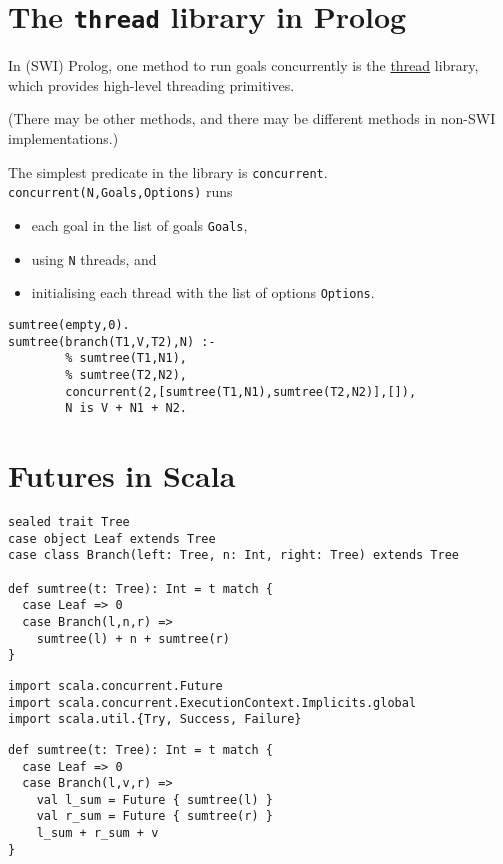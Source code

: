 \documentclass[11pt]{article}
\begin{document}
\section{The \texttt{thread} library in Prolog}
\label{sec:org5ab70c6}
In (SWI) Prolog, one method to run goals concurrently is
the \href{https://www.swi-prolog.org/pldoc/man?section=thread}{thread} library,
which provides high-level threading primitives.

(There may be other methods, and there may be different methods
 in non-SWI implementations.)

The simplest predicate in the library is \texttt{concurrent}.
\texttt{concurrent(N,Goals,Options)} runs
\begin{itemize}
\item each goal in the list of goals \texttt{Goals},
\item using \texttt{N} threads, and
\item initialising each thread with the list of options \texttt{Options}.
\end{itemize}
\begin{verbatim}
sumtree(empty,0).
sumtree(branch(T1,V,T2),N) :-
        % sumtree(T1,N1),
        % sumtree(T2,N2),
        concurrent(2,[sumtree(T1,N1),sumtree(T2,N2)],[]),
        N is V + N1 + N2.
\end{verbatim}

\section{Futures in Scala}
\label{sec:org67e40ab}
\begin{verbatim}
sealed trait Tree
case object Leaf extends Tree
case class Branch(left: Tree, n: Int, right: Tree) extends Tree

def sumtree(t: Tree): Int = t match {
  case Leaf => 0
  case Branch(l,n,r) =>
    sumtree(l) + n + sumtree(r)
}
\end{verbatim}

\begin{verbatim}
import scala.concurrent.Future
import scala.concurrent.ExecutionContext.Implicits.global
import scala.util.{Try, Success, Failure}
\end{verbatim}

\begin{verbatim}
def sumtree(t: Tree): Int = t match {
  case Leaf => 0
  case Branch(l,v,r) =>
    val l_sum = Future { sumtree(l) }
    val r_sum = Future { sumtree(r) }
    l_sum + r_sum + v
}
\end{verbatim}
\end{document}

